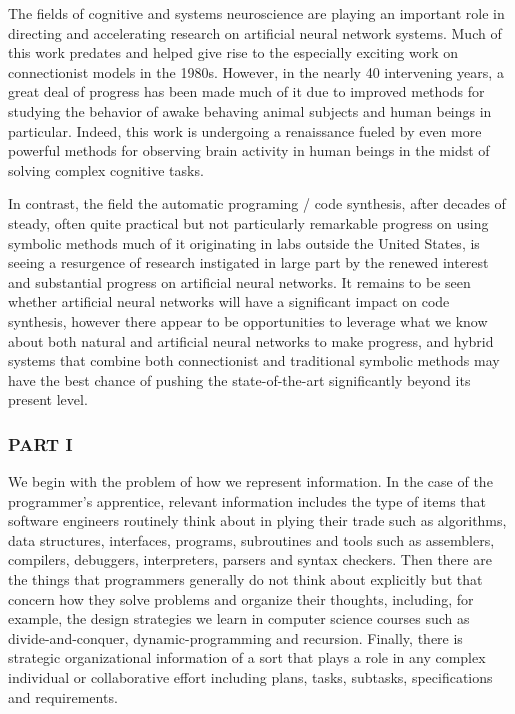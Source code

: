 The fields of cognitive and systems neuroscience are playing an important role in directing and accelerating research on artificial neural network systems. Much of this work predates and helped give rise to the especially exciting work on connectionist models in the 1980s. However, in the nearly 40 intervening years, a great deal of progress has been made much of it due to improved methods for studying the behavior of awake behaving animal subjects and human beings in particular. Indeed, this work is undergoing a renaissance fueled by even more powerful methods for observing brain activity in human beings in the midst of solving complex cognitive tasks.

In contrast, the field the automatic programing / code synthesis, after decades of steady, often quite practical but not particularly remarkable progress on using symbolic methods \emdash{} much of it originating in labs outside the United States, is seeing a resurgence of research instigated in large part by the renewed interest and substantial progress on artificial neural networks. It remains to be seen whether artificial neural networks will have a significant impact on code synthesis, however there appear to be opportunities to leverage what we know about both natural and artificial neural networks to make progress, and hybrid systems that combine both connectionist and traditional symbolic methods may have the best chance of pushing the state-of-the-art significantly beyond its present level.




\subsubsection*{PART I}


We begin with the problem of how we represent information. In the case of the programmer's apprentice, relevant information includes the type of items that software engineers routinely think about in plying their trade such as algorithms, data structures, interfaces, programs, subroutines and tools such as assemblers, compilers, debuggers, interpreters, parsers and syntax checkers. Then there are the things that programmers generally do not think about explicitly but that concern how they solve problems and organize their thoughts, including, for example, the design strategies we learn in computer science courses such as divide-and-conquer, dynamic-programming and recursion. Finally, there is strategic organizational information of a sort that plays a role in any complex individual or collaborative effort including plans, tasks, subtasks, specifications and requirements.

